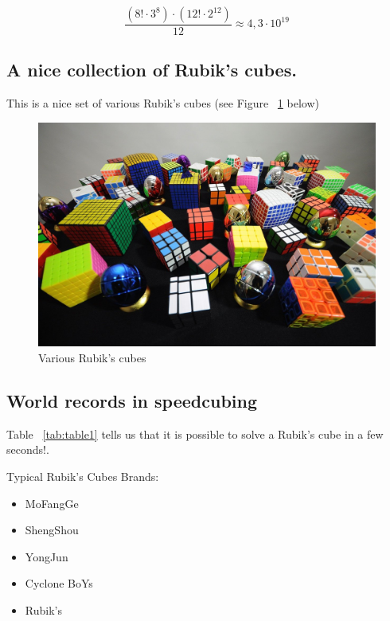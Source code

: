 \begin{equation}
\frac{(8!\cdot3^8)\cdot(12!\cdot2^{12})}{12}  \approx 4,3 \cdot 10^{19}
\end{equation}

\subsection{A nice collection of Rubik's cubes.}
This is a nice set of various Rubik's cubes (see Figure ~\ref{fig:cubes} below)
\vspace{0,5cm}
\begin{figure}[htbp]
\centering
\includegraphics[scale=0.25]{pictures/rubiks.jpg}
\vspace{0,5cm}
\caption{Various Rubik's cubes}
\label{fig:cubes}
\end{figure}
\hspace{3cm}

\subsection{World records in speedcubing}
\vspace{0,5cm}


\vspace{0,5cm}
Table ~\ref{tab:table1} tells us that it is possible to solve a Rubik's cube in a few seconds!.
\vspace{0,5cm}

Typical Rubik's Cubes Brands:
\begin{itemize}
    \item MoFangGe
    \item  ShengShou
     \item YongJun
     \item Cyclone BoYs
     \item Rubik's
\end{itemize}
